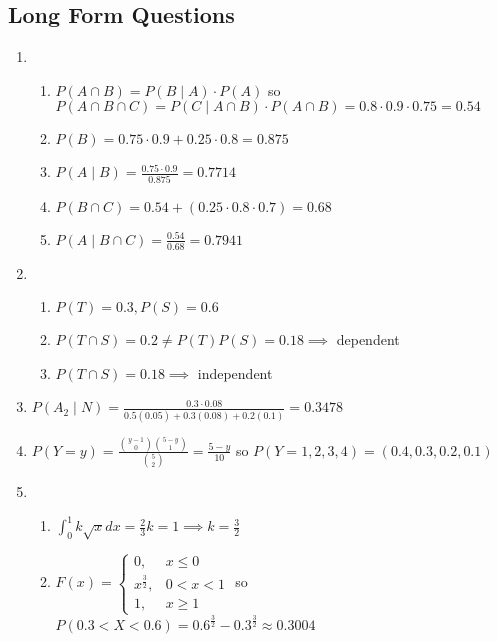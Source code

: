 \documentclass[12pt, a4paper]{article}
\begin{document}
\subsection*{Long Form Questions}
\begin{enumerate}[Q\arabic*.]
  \item 
    \begin{enumerate}[(\roman*)]
      \item $P(A \cap B) = P(B\mid A)\cdot P(A)$ so $P(A\cap B\cap C) = P(C\mid A\cap B)\cdot P(A\cap B) = 0.8\cdot 0.9\cdot 0.75 = 0.54$

      \item $P(B) = 0.75\cdot 0.9 + 0.25\cdot 0.8 = 0.875$

      \item $P(A \mid B) = \frac{0.75\cdot 0.9}{0.875} = 0.7714$

      \item $P(B\cap C) = 0.54 + (0.25 \cdot 0.8\cdot 0.7) = 0.68$

      \item $P(A\mid B\cap C) = \frac{0.54}{0.68} = 0.7941$
    \end{enumerate}

  \item 
    \begin{enumerate}[(\roman*)]
      \item $P(T) = 0.3, P(S) = 0.6$

      \item $P(T\cap S) = 0.2 \neq P(T)P(S) = 0.18 \implies$ dependent

      \item $P(T\cap S) = 0.18 \implies$ independent
    \end{enumerate}

  \item $\displaystyle P(A_2\mid N) = \frac{0.3\cdot 0.08}{0.5(0.05) + 0.3(0.08) + 0.2(0.1)} = 0.3478$  

  \item $\displaystyle P(Y=y) = \frac{\binom {y-1}{0}\binom{5-y}1}{\binom 52} = \frac{5-y}{10}$ so $P(Y=1,2,3,4) = (0.4, 0.3, 0.2, 0.1)$

  \item 
    \begin{enumerate}[(\roman*)]
      \item $\int^1_0 k\sqrt{x}dx= \frac{2}{3}k = 1 \implies k = \frac{3}{2}$

      \item $\displaystyle F(x) = \begin{cases}0, & x\leq 0\\ x^{\frac{3}{2}}, &0<x<1\\1, &x\geq 1\end{cases}$ so $P(0.3 < X < 0.6) = 0.6^{\frac{3}{2}} - 0.3^{\frac{3}{2}} \approx 0.3004$
    \end{enumerate}


\end{enumerate}
\end{document}
